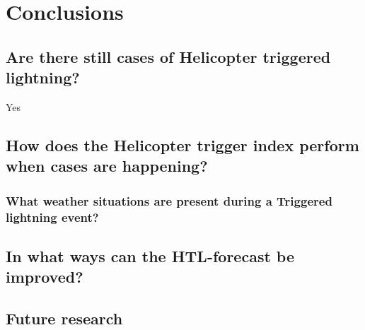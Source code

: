 \chapter{Conclusions}

\section{Are there still cases of Helicopter triggered lightning?}
Yes
\section{How does the Helicopter trigger index perform when cases are happening?}

\subsection{What weather situations are present during a Triggered lightning event?}

\section{In what ways can the HTL-forecast be improved?}

\section{Future research}